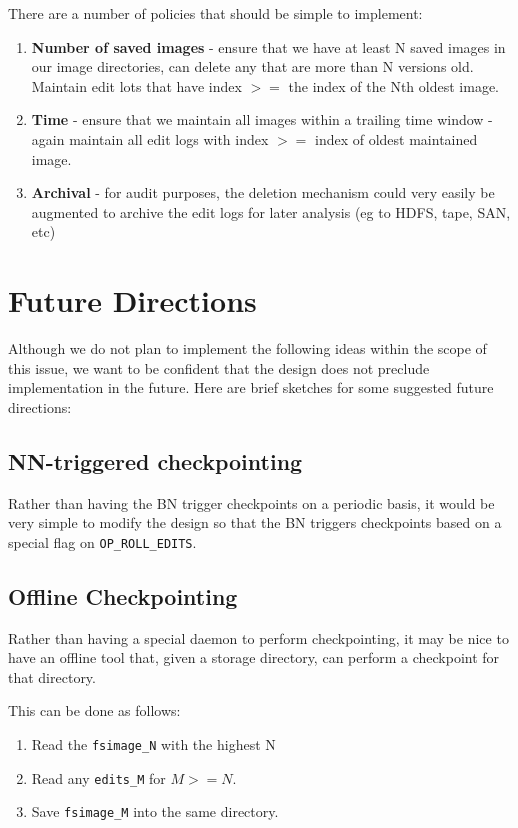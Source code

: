 \documentclass{article}
\begin{document}
There are a number of policies that should be simple to implement:
\begin{enumerate}
\item {\bf Number of saved images} - ensure that we have at least N saved images in our image directories, can delete any that are more than N versions old. Maintain edit lots that have index $>=$ the index of the Nth oldest image.
\item {\bf Time} - ensure that we maintain all images within a trailing time window - again maintain all edit logs with index $>=$ index of oldest maintained image.
\item {\bf Archival} - for audit purposes, the deletion mechanism could very easily be augmented to archive the edit logs for later analysis (eg to HDFS, tape, SAN, etc)
\end{enumerate}

\section{Future Directions}

Although we do not plan to implement the following ideas within the scope of this issue, we want to be confident that the design does not preclude implementation in the future. Here are brief sketches for some suggested future directions:

\subsection{NN-triggered checkpointing}

Rather than having the BN trigger checkpoints on a periodic basis, it would be very simple to modify the design so that the BN triggers checkpoints based on a special flag on {\tt OP\_ROLL\_EDITS}.

\subsection{Offline Checkpointing}

Rather than having a special daemon to perform checkpointing, it may be nice to have an offline tool that, given a storage directory, can perform a checkpoint for that directory.

This can be done as follows:
\begin{enumerate}
\item Read the {\tt fsimage\_N} with the highest N
\item Read any {\tt edits\_M} for $M >= N$.
\item Save {\tt fsimage\_M} into the same directory.
\end{enumerate}
\end{document}
